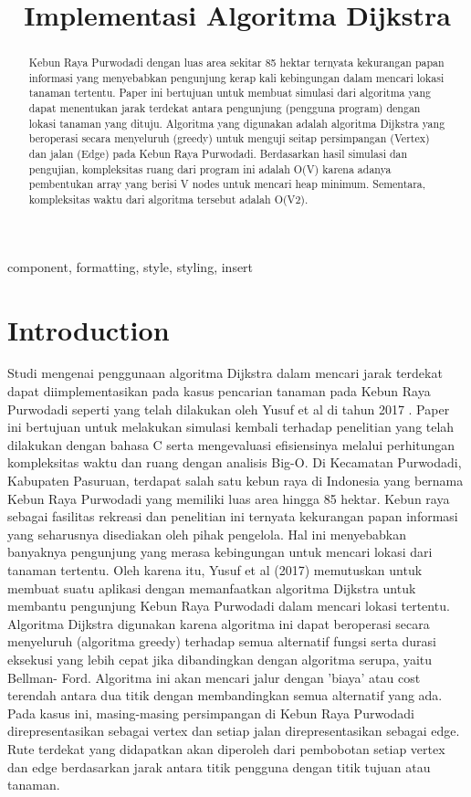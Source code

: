 \documentclass[conference]{IEEEtran}
\title{Implementasi Algoritma Dijkstra}
\author{
\IEEEauthorblockN{Eraraya Morenzo Muten}
\IEEEauthorblockA{\textit{School of Electrical Engineering and Informatics}\\
\textit{Institut Teknologi Bandung}\\
Bandung, Indonesia\\
Emaill: 18320003@std.stei.itb.ac.id}
}
\begin{document}
\maketitle

\begin{abstract}
    Kebun Raya Purwodadi dengan luas area sekitar 85
hektar ternyata kekurangan papan informasi yang menyebabkan
pengunjung kerap kali kebingungan dalam mencari lokasi tanaman
tertentu. Paper ini bertujuan untuk membuat simulasi
dari algoritma yang dapat menentukan jarak terdekat antara
pengunjung (pengguna program) dengan lokasi tanaman yang
dituju. Algoritma yang digunakan adalah algoritma Dijkstra
yang beroperasi secara menyeluruh (greedy) untuk menguji
seitap persimpangan (Vertex) dan jalan (Edge) pada Kebun
Raya Purwodadi. Berdasarkan hasil simulasi dan pengujian,
kompleksitas ruang dari program ini adalah O(V) karena adanya
pembentukan array yang berisi V nodes untuk mencari heap minimum.
Sementara, kompleksitas waktu dari algoritma tersebut
adalah O(V2).
\end{abstract}

\begin{IEEEkeywords}
    component, formatting, style, styling, insert
\end{IEEEkeywords}

\section{Introduction}
Studi mengenai penggunaan algoritma Dijkstra dalam mencari
jarak terdekat dapat diimplementasikan pada kasus pencarian
tanaman pada Kebun Raya Purwodadi seperti yang telah
dilakukan oleh Yusuf et al di tahun 2017 \cite{yusuf2017implementasi}. Paper ini bertujuan
untuk melakukan simulasi kembali terhadap penelitian
yang telah dilakukan dengan bahasa C serta mengevaluasi
efisiensinya melalui perhitungan kompleksitas waktu dan ruang
dengan analisis Big-O.
Di Kecamatan Purwodadi, Kabupaten Pasuruan, terdapat
salah satu kebun raya di Indonesia yang bernama Kebun
Raya Purwodadi yang memiliki luas area hingga 85 hektar.
Kebun raya sebagai fasilitas rekreasi dan penelitian ini ternyata
kekurangan papan informasi yang seharusnya disediakan oleh
pihak pengelola. Hal ini menyebabkan banyaknya pengunjung
yang merasa kebingungan untuk mencari lokasi dari tanaman
tertentu. Oleh karena itu, Yusuf et al (2017) memutuskan
untuk membuat suatu aplikasi dengan memanfaatkan algoritma
Dijkstra untuk membantu pengunjung Kebun Raya Purwodadi
dalam mencari lokasi tertentu.
Algoritma Dijkstra digunakan karena algoritma ini dapat
beroperasi secara menyeluruh (algoritma greedy) terhadap
semua alternatif fungsi serta durasi eksekusi yang lebih cepat
jika dibandingkan dengan algoritma serupa, yaitu Bellman-
Ford. Algoritma ini akan mencari jalur dengan ’biaya’ atau
cost terendah antara dua titik dengan membandingkan semua
alternatif yang ada.
Pada kasus ini, masing-masing persimpangan di Kebun
Raya Purwodadi direpresentasikan sebagai vertex dan setiap
jalan direpresentasikan sebagai edge. Rute terdekat yang didapatkan
akan diperoleh dari pembobotan setiap vertex dan edge
berdasarkan jarak antara titik pengguna dengan titik tujuan
atau tanaman.
\end{document}
